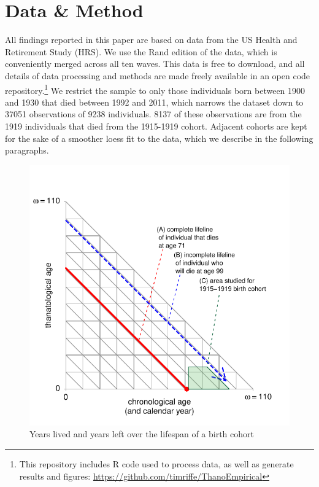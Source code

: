 \documentclass[11pt,oneside,a4paper]{article}
\begin{document}
\section*{Data \& Method}

All findings reported in this paper are based on data from the US Health and
Retirement Study (HRS). We use the Rand edition of the data, which is
conveniently merged across all ten waves. This data is free to download,
and all details of data processing and methods are made freely available in an open code
repository.\footnote{This
repository includes R code used to process data, as well as generate results and
figures: \url{https://github.com/timriffe/ThanoEmpirical}} We restrict the sample to only those individuals born between 1900 and 1930 that died between 1992 and 2011, which narrows the dataset down to 37051 observations of 9238 individuals. 8137 of these observations are from the 1919 individuals that died from the 1915-1919 cohort. Adjacent cohorts are kept for the sake of a
smoother loess fit to the data, which we describe in the following paragraphs.

\begin{figure}[!h]
\centering
\caption{Years lived and years left over the lifespan of a birth cohort}
\label{fig:LexisOrtho}
	\includegraphics{Figures/LexisOrtho.pdf}
\end{figure}
\end{document}

